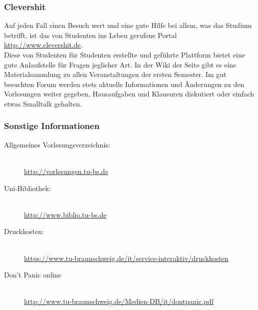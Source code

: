 	\subsubsection{Clevershit}

		Auf jeden Fall einen Besuch wert und eine gute Hilfe bei allem, was das Studium betrifft, ist das von Studenten ins Leben gerufene Portal \mbox{\url{http://www.clevershit.de}}.\\
		Diese von Studenten für Studenten erstellte und geführte Plattform bietet eine gute Anlaufstelle für Fragen jeglicher Art. In der Wiki der Seite gibt es eine Materialsammlung zu allen Veranstaltungen der ersten Semester. Im gut besuchten Forum werden stets aktuelle Informationen und Änderungen zu den Vorlesungen weiter gegeben, Hausaufgaben und Klausuren diskutiert oder einfach etwas Smalltalk gehalten.

\subsubsection*{Sonstige Informationen}
	\begin{description}
		\item[Allgemeines Vorlesungsverzeichnis:] ~\\
			{\footnotesize\url{http://vorlesungen.tu-bs.de}}
		\item[Uni-Bibliothek:] ~\\
			{\footnotesize\url{http://www.biblio.tu-bs.de}}
		\item[Druckkosten:] ~\\
			{\footnotesize\url{https://www.tu-braunschweig.de/it/service-interaktiv/druckkosten}}
		\item[Don't Panic online] ~\\
			{\footnotesize\url{http://www.tu-braunschweig.de/Medien-DB/it/dontpanic.pdf}}
	\end{description}
